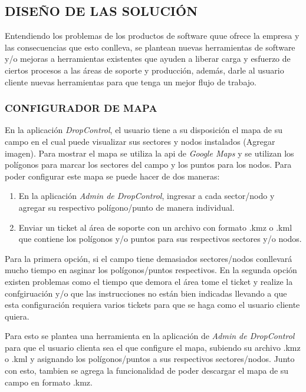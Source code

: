 

\subsection{DISEÑO DE LAS SOLUCIÓN}

Entendiendo los problemas de los productos de software quue ofrece la empresa y las consecuencias que esto conlleva,
se plantean nuevas herramientas de software y/o mejoras a herramientas existentes que ayuden a liberar carga y esfuerzo
de ciertos procesos a las áreas de soporte y producción, además, darle al usuario cliente nuevas herramientas para que tenga un mejor flujo de trabajo.

\subsubsection{CONFIGURADOR DE MAPA}

En la aplicación \textit{DropControl}, el usuario tiene a su disposición el mapa de su campo en el cual puede visualizar sus sectores y nodos instalados (Agregar imagen). 
Para mostrar el mapa se utiliza la api de \textit{Google Maps} y se utilizan los polígonos para marcar los sectores del campo y los puntos para los nodos.
Para poder configurar este mapa se puede hacer de dos maneras:
\begin{enumerate}
    \item En la aplicación \textit{Admin de DropControl}, ingresar a cada sector/nodo y agregar su respectivo polígono/punto de manera individual.
    \item Enviar un ticket al área de soporte con un archivo con formato .kmz o .kml que contiene los polígonos y/o puntos para sus respectivos sectores y/o nodos.
\end{enumerate}
Para la primera opción, si el campo tiene demasiados sectores/nodos conllevará mucho tiempo en asginar los polígonos/puntos respectivos.
En la segunda opción existen problemas como el tiempo que demora el área tome el ticket y realize la confgiruación y/o 
que las instrucciones no están bien indicadas llevando a que esta configuración requiera varios tickets para que se haga como el usuario cliente quiera.

Para esto se plantea una herramienta en la aplicación de \textit{Admin de DropControl} para que el usuario clienta sea el que
configure el mapa, subiendo su archivo .kmz o .kml y asignando los polígonos/puntos a sus respectivos sectores/nodos.
Junto con esto, tambien se agrega la funcionalidad de poder descargar el mapa de su campo en formato .kmz.

